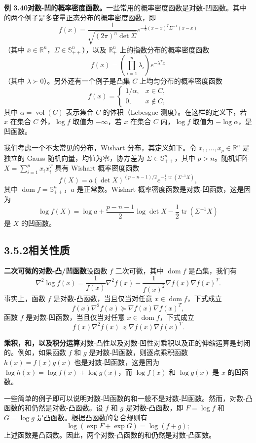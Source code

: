 \documentclass[UTF8, 12pt, fontset=fandol, oneside]{ctexart}
\DeclareMathOperator{\dom}{dom}
\begin{document}
\noindent\textbf{例 3.40\quad 对数-凹的概率密度函数。}\quad 一些常用的概率密度函数是对数-凹函数。其中的两个例子是多变量正态分布的概率密度函数，即
\[
f(x)=\frac{1}{\sqrt{(2\pi)^n\det\Sigma}}
e^{-\frac{1}{2}(x-\bar x)^T\Sigma^{-1}(x-\bar x)}
\]
（其中 $\bar x\in\mathbb{R}^n$，$\Sigma\in\mathbb{S}_{++}^n$），以及 $\mathbb{R}_+^n$ 上的指数分布的概率密度函数
\[
f(x)=\left(\prod_{i=1}^n\lambda_i\right)e^{-\lambda^Tx}
\]
（其中 $\lambda\succ0$）。另外还有一个例子是凸集 $C$ 上均匀分布的概率密度函数
\[
f(x)=
\begin{cases}
1/\alpha, & x\in C,\\
0, & x\notin C,
\end{cases}
\]
其中 $\alpha=\operatorname{vol}(C)$ 表示集合 $C$ 的体积（Lebesgue 测度）。在这样的定义下，若 $x$ 在集合 $C$ 外，$\log f$ 取值为 $-\infty$，若 $x$ 在集合 $C$ 内，$\log f$ 取值为 $-\log\alpha$，是凹函数。

我们考虑一个不太常见的分布，Wishart 分布，其定义如下。令 $x_1,\ldots,x_p\in\mathbb{R}^n$ 是独立的 Gauss 随机向量，均值为零，协方差为 $\Sigma\in\mathbb{S}_{++}^n$，其中 $p>n$。随机矩阵 $X=\sum_{i=1}^p x_ix_i^T$ 具有 Wishart 概率密度函数
\[
f(X)=a(\det X)^{(p-n-1)/2}e^{-\frac{1}{2}\operatorname{tr}(\Sigma^{-1}X)},
\]
其中 $\dom f=\mathbb{S}_{++}^n$，$a$ 是正常数。Wishart 概率密度函数是对数-凹函数，这是因为
\[
\log f(X)=\log a+\frac{p-n-1}{2}\log\det X-\frac{1}{2}\operatorname{tr}(\Sigma^{-1}X)
\]
是 $X$ 的凹函数。

\subsection*{3.5.2\quad 相关性质}

\noindent\textbf{二次可微的对数-凸/凹函数}\quad 设函数 $f$ 二次可微，其中 $\dom f$ 是凸集，我们有
\[
\nabla^2\log f(x)=\frac{1}{f(x)}\nabla^2 f(x)-\frac{1}{f(x)^2}\nabla f(x)\nabla f(x)^T.
\]
事实上，函数 $f$ 是对数-凸函数，当且仅当对任意 $x\in\dom f$，下式成立
\[
f(x)\nabla^2 f(x)\succeq\nabla f(x)\nabla f(x)^T,
\]
函数 $f$ 是对数-凹函数，当且仅当对任意 $x\in\dom f$，下式成立
\[
f(x)\nabla^2 f(x)\preceq\nabla f(x)\nabla f(x)^T.
\]

\noindent\textbf{乘积，和，以及积分运算}\quad 对数-凸性以及对数-凹性对乘积以及正的伸缩运算是封闭的。例如，如果函数 $f$ 和 $g$ 是对数-凹函数，则逐点乘积函数 $h(x)=f(x)g(x)$ 也是对数-凹函数，这是因为 $\log h(x)=\log f(x)+\log g(x)$，而 $\log f(x)$ 和 $\log g(x)$ 是 $x$ 的凹函数。

一些简单的例子即可以说明对数-凹函数的和一般不是对数-凹函数。然而，对数-凸函数的和仍然是对数-凸函数。设 $f$ 和 $g$ 是对数-凸函数，即 $F=\log f$ 和 $G=\log g$ 是凸函数。根据凸函数的复合规则有
\[
\log(\exp F+\exp G)=\log(f+g);
\]
上述函数是凸函数。因此，两个对数-凸函数的和仍然是对数-凸函数。
\end{document}

